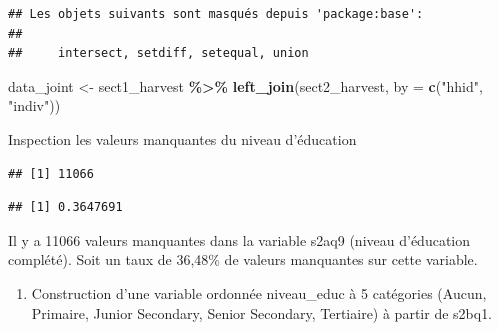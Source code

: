 \documentclass[
]{article}
\newenvironment{Shaded}{\begin{snugshade}}{\end{snugshade}}
\newcommand{\AttributeTok}[1]{\textcolor[rgb]{0.13,0.29,0.53}{#1}}
\newcommand{\FunctionTok}[1]{\textcolor[rgb]{0.13,0.29,0.53}{\textbf{#1}}}
\newcommand{\NormalTok}[1]{#1}
\newcommand{\OtherTok}[1]{\textcolor[rgb]{0.56,0.35,0.01}{#1}}
\newcommand{\SpecialCharTok}[1]{\textcolor[rgb]{0.81,0.36,0.00}{\textbf{#1}}}
\newcommand{\StringTok}[1]{\textcolor[rgb]{0.31,0.60,0.02}{#1}}
\providecommand{\tightlist}{%
  \setlength{\itemsep}{0pt}\setlength{\parskip}{0pt}}
\begin{document}
\begin{verbatim}
## Les objets suivants sont masqués depuis 'package:base':
## 
##     intersect, setdiff, setequal, union
\end{verbatim}

\begin{Shaded}
\begin{Highlighting}[]
\NormalTok{data\_joint }\OtherTok{\textless{}{-}}\NormalTok{ sect1\_harvest }\SpecialCharTok{\%\textgreater{}\%}
  \FunctionTok{left\_join}\NormalTok{(sect2\_harvest, }\AttributeTok{by =} \FunctionTok{c}\NormalTok{(}\StringTok{"hhid"}\NormalTok{, }\StringTok{"indiv"}\NormalTok{))}
\end{Highlighting}
\end{Shaded}

Inspection les valeurs manquantes du niveau d'éducation

\begin{Shaded}
\end{Shaded}

\begin{verbatim}
## [1] 11066
\end{verbatim}

\begin{Shaded}
\end{Shaded}

\begin{verbatim}
## [1] 0.3647691
\end{verbatim}

Il y a 11066 valeurs manquantes dans la variable s2aq9 (niveau
d'éducation complété). Soit un taux de 36,48\% de valeurs manquantes sur
cette variable.

\begin{enumerate}
\def\labelenumi{\arabic{enumi}.}
\setcounter{enumi}{7}
\tightlist
\item
  Construction d'une variable ordonnée niveau\_educ à 5 catégories
  (Aucun, Primaire, Junior Secondary, Senior Secondary, Tertiaire) à
  partir de s2bq1.
\end{enumerate}
\end{document}
